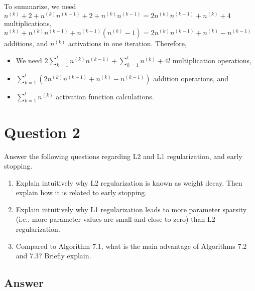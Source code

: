 \documentclass[
	12pt, %
]{../Template/fphw}
\begin{document}
\begin{enumerate}[label=(\arabic*)]
\begin{itemize}
\end{itemize}
To summarize, we need $n^{(k)} + 2+n^{(k)}n^{(k-1)}+2+n^{(k)}n^{(k-1)}= 2n^{(k)}n^{(k-1)}+n^{(k)}+4$ multiplications, $n^{(k)}+n^{(k)}n^{(k-1)}+n^{(k-1)}(n^{(k)}-1) = 2n^{(k)}n^{(k-1)}+n^{(k)}-n^{(k-1)}$ additions, and $n^{(k)}$ activations in one iteration. Therefore,
\begin{itemize}
\item We need $2\sum_{k=1}^{l}n^{(k)}n^{(k-1)} +\sum_{k=1}^{l}n^{(k)} +4l$ multiplication operations,
\item $\sum_{k=1}^{l}\left(2n^{(k)}n^{(k-1)}+n^{(k)}-n^{(k-1)}\right)$ addition operations, and
\item $\sum_{k=1}^{l}n^{(k)}$ activation function calculations.
\end{itemize}

\end{enumerate}


\section*{Question 2}

\begin{problem}
     Answer the following questions regarding L2 and L1 regularization, and early stopping.
     \begin{enumerate}[label = (\arabic*)]
        \item Explain intuitively why L2 regularization is known as weight decay. Then explain how it is related to early
        stopping.
        \item Explain intuitively why L1 regularization leads to more parameter sparsity (i.e., more parameter values are small
        and close to zero) than L2 regularization.
        \item Compared to Algorithm 7.1, what is the main advantage of Algorithms 7.2 and 7.3? Briefly explain.
    \end{enumerate}
\end{problem}


\subsection*{Answer}
\end{document}
